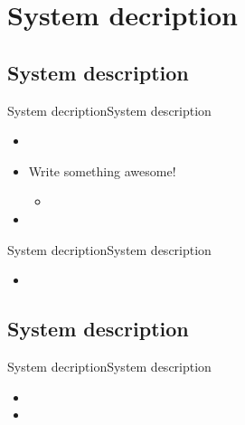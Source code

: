 \section{System decription}



\subsection{System description}

\begin{frame}{System decription}{System description}
% 
\begin{itemize}
	\item<1->  
	\item<1-> Write something awesome!
	\begin{itemize}
		\item
	\end{itemize}
	\item<1-> 
\end{itemize}

\end{frame}


\begin{frame}{System decription}{System description}
\begin{itemize}
	\item<1-> 
\end{itemize}	
%  
\end{frame}

\subsection{System description}

\begin{frame}{System decription}{System description}
\begin{itemize}
	\item<1->    
	\item<1->    
\end{itemize}
%  
\end{frame}







